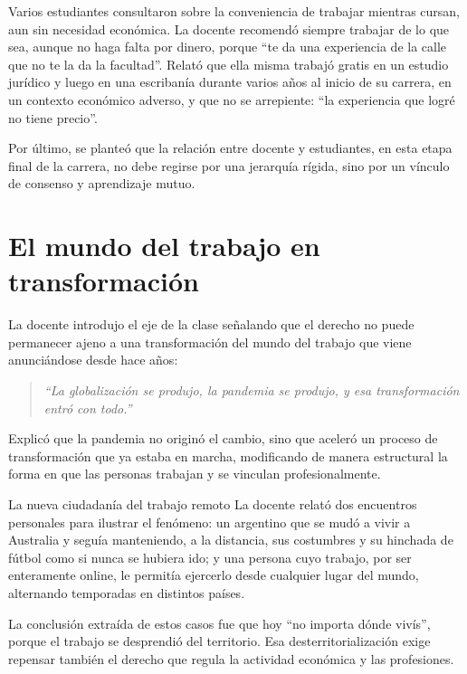 \documentclass[12pt,oneside]{book}
\begin{document}
\begin{note}
Varios estudiantes consultaron sobre la conveniencia de trabajar mientras cursan, aun sin necesidad económica. La docente recomendó siempre trabajar de lo que sea, aunque no haga falta por dinero, porque ``te da una experiencia de la calle que no te la da la facultad''. Relató que ella misma trabajó gratis en un estudio jurídico y luego en una escribanía durante varios años al inicio de su carrera, en un contexto económico adverso, y que no se arrepiente: ``la experiencia que logré no tiene precio''.
\end{note}

Por último, se planteó que la relación entre docente y estudiantes, en esta etapa final de la carrera, no debe regirse por una jerarquía rígida, sino por un vínculo de consenso y aprendizaje mutuo.

\section{El mundo del trabajo en transformación}

La docente introdujo el eje de la clase señalando que el derecho no puede permanecer ajeno a una transformación del mundo del trabajo que viene anunciándose desde hace años:

\begin{quote}
\textit{``La globalización se produjo, la pandemia se produjo, y esa transformación entró con todo.''}
\end{quote}

Explicó que la pandemia no originó el cambio, sino que aceleró un proceso de transformación que ya estaba en marcha, modificando de manera estructural la forma en que las personas trabajan y se vinculan profesionalmente.

\begin{example}{La nueva ciudadanía del trabajo remoto}
La docente relató dos encuentros personales para ilustrar el fenómeno: un argentino que se mudó a vivir a Australia y seguía manteniendo, a la distancia, sus costumbres y su hinchada de fútbol como si nunca se hubiera ido; y una persona cuyo trabajo, por ser enteramente online, le permitía ejercerlo desde cualquier lugar del mundo, alternando temporadas en distintos países.

La conclusión extraída de estos casos fue que hoy ``no importa dónde vivís'', porque el trabajo se desprendió del territorio. Esa desterritorialización exige repensar también el derecho que regula la actividad económica y las profesiones.
\end{example}
\end{document}
